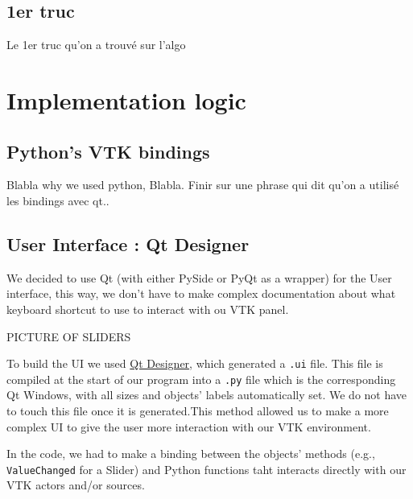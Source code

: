 \documentclass[10pt,twocolumn,letterpaper]{article}
\def\code#1{\texttt{#1}}
\begin{document}
    \subsection{1er truc}

Le 1er truc qu'on a trouvé sur l'algo


\section{Implementation logic}

    \subsection{Python's VTK bindings}

Blabla why we used python, Blabla.
Finir sur une phrase qui dit qu'on a utilisé les bindings avec qt..

    \subsection{User Interface : Qt Designer}

    We decided to use Qt (with either PySide or PyQt as a wrapper) for the User
interface, this way, we don't have to make complex documentation about what
keyboard shortcut to use to interact with ou VTK panel. 

PICTURE OF SLIDERS

To build the UI we used \href{https://doc.qt.io/qt-5/qtdesigner-manual.html}{Qt Designer},
which generated a \code{.ui} file. This file is compiled at the start of our
program into a \code{.py} file which is the corresponding Qt Windows, with all
sizes and objects' labels automatically set. We do not have to touch this file
once it is generated.This method allowed us to make a more complex UI to give
the user more interaction with our VTK environment.

In the code, we had to make a binding between the objects' methods (e.g.,
\code{ValueChanged} for a Slider) and Python functions taht interacts directly with
our VTK actors and/or sources.
\end{document}
